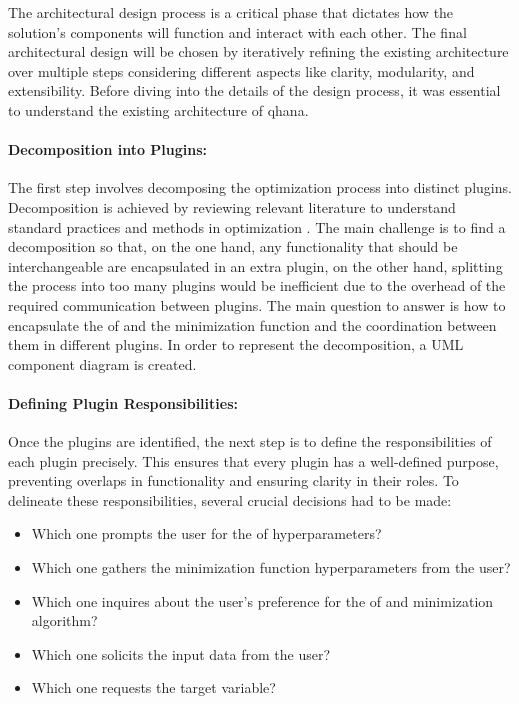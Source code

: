 \documentclass[
  a4paper,  %
  twoside,  %
  bibliography=totoc,
  headsepline,
  cleardoublepage=empty,
  parskip=half,
  draft=false
]{scrbook}
\begin{document}
The architectural design process is a critical phase that dictates how the solution's components will function and interact with each other.
The final architectural design will be chosen by iteratively refining the existing architecture over multiple steps considering different aspects like clarity, modularity, and extensibility.
Before diving into the details of the design process, it was essential to understand the existing architecture of \gls{qhana}.

\paragraph{Decomposition into Plugins:}
The first step involves decomposing the optimization process into distinct plugins.
Decomposition is achieved by reviewing relevant literature to understand standard practices and methods in optimization \cite{Virtanen2020, Nocedal2006, ShalevShwartz2014, Weinan2017}.
The main challenge is to find a decomposition so that, on the one hand, any functionality that should be interchangeable are encapsulated in an extra plugin,
on the other hand, splitting the process into too many plugins would be inefficient due to the overhead of the required communication between plugins.
The main question to answer is how to encapsulate the \gls{of} and the minimization function and the coordination between them in different plugins.
In order to represent the decomposition, a UML component diagram is created.

\paragraph{Defining Plugin Responsibilities:}
Once the plugins are identified, the next step is to define the responsibilities of each plugin precisely.
This ensures that every plugin has a well-defined purpose, preventing overlaps in functionality and ensuring clarity in their roles.
To delineate these responsibilities, several crucial decisions had to be made:

\begin{itemize}
  \item Which one prompts the user for the \gls{of} hyperparameters?
  \item Which one gathers the minimization function hyperparameters from the user?
  \item Which one inquires about the user's preference for the \gls{of} and minimization algorithm?
  \item Which one solicits the input data from the user?
  \item Which one requests the target variable?
\end{itemize}
\end{document}

